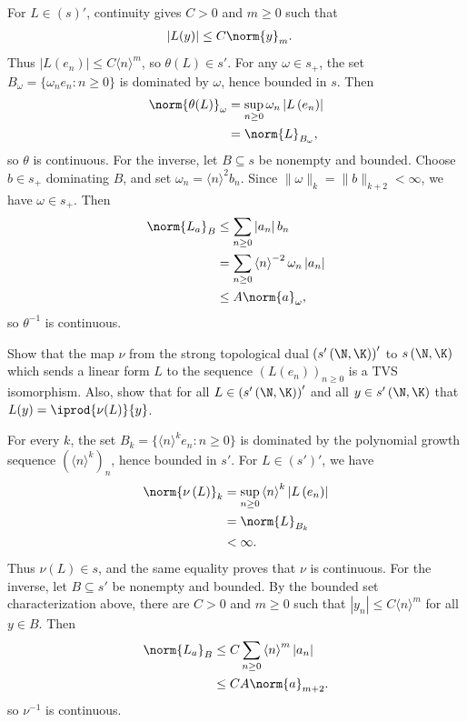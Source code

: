 \documentclass[10pt]{mypackage}
\begin{document}
\begin{solution}
For \(L\in(s)'\), continuity gives \(C>0\) and \(m\ge0\) such that
\begin{align*}
  \left\vert L(y) \right\vert &\leq C\norm{y}_{m}.
\end{align*}
Thus \(|L(e_n)|\le C\langle n\rangle^m\), so \(\theta(L)\in s'\). For any \(\omega\in s_+\), the set \(B_\omega=\{\omega_ne_n:n\ge0\}\) is dominated by \(\omega\), hence bounded in \(s\). Then
\begin{align*}
  \norm{\theta(L)}_{\omega} &= \sup_{n\geq 0} \omega_n \left\vert L\left( e_n \right) \right\vert\\
                            &= \norm{L}_{B_{\omega}},
\end{align*}
so \(\theta\) is continuous. For the inverse, let \(B\subseteq s\) be nonempty and bounded. Choose \(b\in s_+\) dominating \(B\), and set \(\omega_n=\langle n\rangle^2b_n\). Since \(\|\omega\|_k=\|b\|_{k+2}<\infty\), we have \(\omega\in s_+\). Then
\begin{align*}
  \norm{L_a}_{B} &\leq \sum_{n\geq 0} \left\vert a_n \right\vert b_n\\
                 &= \sum_{n\geq 0} \left\langle n \right\rangle^{-2} \omega_n \left\vert a_n \right\vert\\
                 &\leq A\norm{a}_{\omega},
\end{align*}
so \(\theta^{-1}\) is continuous.
\end{solution}
\begin{problem}[Problem IV.5]
  Show that the map $\nu$ from the strong topological dual $\left( s'\left( \N,\K \right) \right)'$ to $s\left( \N,\K \right)$ which sends a linear form $L$ to the sequence $\left( L\left( e_n \right) \right)_{n\geq 0}$ is a TVS isomorphism. Also, show that for all $L\in \left( s'\left( \N,\K \right) \right)'$ and all $y\in s'\left( \N,\K \right)$ that $L(y) = \iprod{\nu(L)}{y}$.
\end{problem}
\begin{solution}
  For every \(k\), the set \(B_k=\{\langle n\rangle^ke_n:n\ge0\}\) is dominated by the polynomial growth sequence \((\langle n\rangle^k)_n\), hence bounded in \(s'\). For \(L\in(s')'\), we have
  \begin{align*}
    \norm{\nu\left( L \right)}_{k} &= \sup_{n\geq 0} \left\langle n \right\rangle^{k} \left\vert L\left( e_n \right) \right\vert\\
                                   &= \norm{L}_{B_k}\\
                                   &< \infty.
  \end{align*}
Thus \(\nu(L)\in s\), and the same equality proves that \(\nu\) is continuous. For the inverse, let \(B\subseteq s'\) be nonempty and bounded. By the bounded set characterization above, there are \(C>0\) and \(m\ge0\) such that \(|y_n|\le C\langle n\rangle^m\) for all \(y\in B\). Then
\begin{align*}
  \norm{L_a}_{B} &\leq C\sum_{n\geq 0} \left\langle n \right\rangle^{m} \left\vert a_n \right\vert\\
                 &\leq CA \norm{a}_{m+2}.
\end{align*}
so \(\nu^{-1}\) is continuous.
\end{solution}
\end{document}
